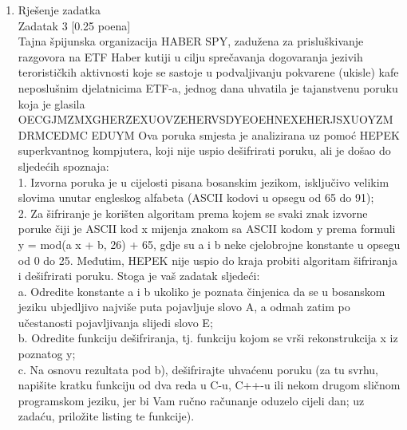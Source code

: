 \documentclass[12pt]{article}
\begin{document}
\begin{enumerate}
		\item Rješenje zadatka \\
		
		Zadatak 3 [0.25 poena] \\
		
Tajna špijunska organizacija HABER SPY, zadužena za prisluškivanje razgovora na ETF
Haber kutiji u cilju sprečavanja dogovaranja jezivih terorističkih aktivnosti koje se sastoje u
podvaljivanju pokvarene (ukisle) kafe neposlušnim djelatnicima ETF-a, jednog dana uhvatila
je tajanstvenu poruku koja je glasila
OECGJMZMXGHERZEXUOVZEHERVSDYEOEHNEXEHERJSXUOYZMDRMCEDMC
EDUYM
Ova poruka smjesta je analizirana uz pomoć HEPEK superkvantnog kompjutera, koji nije
uspio dešifrirati poruku, ali je došao do sljedećih spoznaja: \\

1. Izvorna poruka je u cijelosti pisana bosanskim jezikom, isključivo velikim slovima
unutar engleskog alfabeta (ASCII kodovi u opsegu od 65 do 91); \\

2. Za šifriranje je korišten algoritam prema kojem se svaki znak izvorne poruke čiji je
ASCII kod x mijenja znakom sa ASCII kodom y prema formuli y = mod(a x + b, 26) +
65, gdje su a i b neke cjelobrojne konstante u opsegu od 0 do 25.
Međutim, HEPEK nije uspio do kraja probiti algoritam šifriranja i dešifrirati poruku. Stoga je
vaš zadatak sljedeći: \\ 

a. Odredite konstante a i b ukoliko je poznata činjenica da se u bosanskom jeziku
ubjedljivo najviše puta pojavljuje slovo A, a odmah zatim po učestanosti pojavljivanja
slijedi slovo E; \\

b. Odredite funkciju dešifriranja, tj. funkciju kojom se vrši rekonstrukcija x iz
poznatog y; \\ 

c. Na osnovu rezultata pod b), dešifrirajte uhvaćenu poruku (za tu svrhu, napišite kratku
funkciju od dva reda u C-u, C++-u ili nekom drugom sličnom programskom jeziku, jer
bi Vam ručno računanje oduzelo cijeli dan; uz zadaću, priložite listing te funkcije). \\

\newpage


\end{enumerate}
\end{document}
